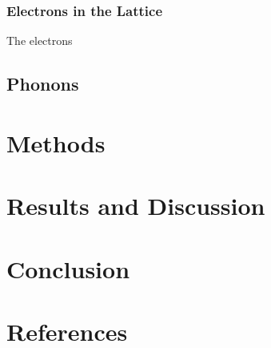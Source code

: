 \documentclass[12pt]{article}
\begin{document}
\subsubsection{Electrons in the Lattice}
The electrons 
\subsection{Phonons}

\section{Methods}


\section{Results and Discussion}

\section{Conclusion}

\section{References}





\appendix
\end{document}
